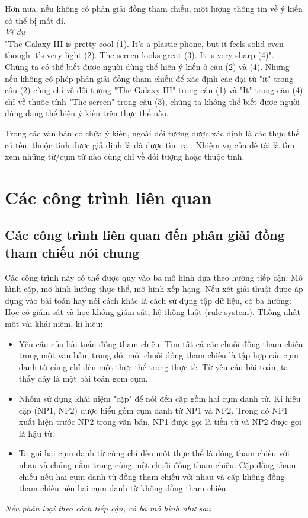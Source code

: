 \documentclass[12pt]{extarticle}
\begin{document}
		\par Hơn nữa, nếu không có phân giải đồng tham chiếu, một lượng thông tin về ý kiến có thể bị mất đi.\\
		\textit{Ví dụ}\\
		"The Galaxy III is pretty cool (1). It's a plastic phone, but it feels solid even though it's very light (2). The screen looks great (3). It is very sharp (4)".
		\\Chúng ta có thể biết được người dùng thể hiện ý kiến ở câu (2) và (4). Nhưng nếu không có phép phân giải đồng tham chiếu để xác định các đại từ "it" trong câu (2) cùng chỉ về đối tượng "The Galaxy III" trong câu (1) và "It" trong câu (4) chỉ về thuộc tính "The screen" trong câu (3), chúng ta không thể biết được người dùng đang thể hiện ý kiến trên thực thể nào.
		\par Trong các văn bản có chứa ý kiến, ngoài đối tượng được xác định là các thực thể có tên, thuộc tính được giả định là đã được tìm ra \cite{findfeatures1} \cite{findfeatures2}. Nhiệm vụ của đề tài là tìm xem những từ/cụm từ nào cùng chỉ về đối tượng hoặc thuộc tính.			

	\section{Các công trình liên quan}
		\subsection{Các công trình liên quan đến phân giải đồng tham chiếu nói chung}
			\par Các công trình này có thể được quy vào ba mô hình dựa theo hướng tiếp cận: Mô hình cặp, mô hình hướng thực thể, mô hình xếp hạng. Nếu xét giải thuật được áp dụng vào bài toán hay nói cách khác là cách sử dụng tập dữ liệu, có ba hướng: Học có giám sát và học không giám sát, hệ thống luật (rule-system). 
			Thống nhất một vài khái niệm, kí hiệu:
				\begin{itemize}
					\item{Yêu cầu của bài toán đồng tham chiếu: Tìm tất cả các chuỗi đồng tham chiếu trong một văn bản; trong đó, mỗi chuỗi đồng tham chiếu là tập hợp các cụm danh từ cùng chỉ đến một thực thể trong thực tế. Từ yêu cầu bài toán, ta thấy đây là một bài toán gom cụm.} 
					\item{Nhóm sử dụng khái niệm "cặp" để nói đến cặp gồm hai cụm danh từ. Kí hiệu cặp (NP1, NP2) được hiểu gồm cụm danh từ NP1 và NP2. Trong đó NP1 xuất hiện trước NP2 trong văn bản, NP1 được gọi là tiền từ và NP2 được gọi là hậu từ.}
					\item{Ta gọi hai cụm danh từ cùng chỉ đến một thực thể là đồng tham chiếu với nhau và chúng nằm trong cùng một chuỗi đồng tham chiếu. Cặp đồng tham chiếu nếu hai cụm danh từ đồng tham chiếu với nhau và cặp không đồng tham chiếu nếu hai cụm danh từ không đồng tham chiếu.}
				\end{itemize}
			\par \textit{Nếu phân loại theo cách tiếp cận, có ba mô hình như sau}
\end{document}
